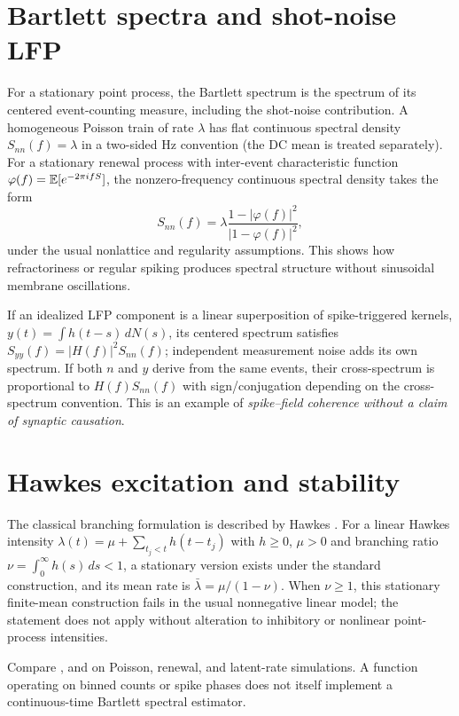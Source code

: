 \section{Bartlett spectra and shot-noise LFP}
For a stationary point process, the Bartlett spectrum is the
spectrum of its centered event-counting measure, including
the shot-noise contribution. A homogeneous Poisson train of
rate $\lambda$ has flat continuous spectral density
$S_{nn}(f)=\lambda$ in a two-sided Hz convention
(the DC mean is treated separately).
For a stationary renewal process with inter-event characteristic
function $\varphi(f)=\mathbb{E}[e^{-2\pi ifS}]$, the nonzero-frequency
continuous spectral density takes the form
\[
S_{nn}(f)=\lambda
\frac{1-|\varphi(f)|^2}{|1-\varphi(f)|^2},
\]
under the usual nonlattice and regularity assumptions.
This shows how refractoriness or regular spiking produces
spectral structure without sinusoidal membrane oscillations.

If an idealized LFP component is a linear superposition of
spike-triggered kernels, $y(t)=\int h(t-s)\,dN(s)$,
its centered spectrum satisfies
$S_{yy}(f)=|H(f)|^2S_{nn}(f)$;
independent measurement noise adds its own spectrum.
If both $n$ and $y$ derive from the same events, their cross-spectrum
is proportional to $H(f)S_{nn}(f)$ with sign/conjugation depending
on the cross-spectrum convention. This is an example of
\emph{spike--field coherence without a claim of synaptic causation}.

\section{Hawkes excitation and stability}\label{sec:hawkes}
The classical branching formulation is described by Hawkes
\cite{hawkes1971}.
For a linear Hawkes intensity
$\lambda(t)=\mu+\sum_{t_j<t}h(t-t_j)$ with
$h\ge0$, $\mu>0$ and branching ratio
$\nu=\int_0^\infty h(s)\,ds<1$,
a stationary version exists under the standard construction,
and its mean rate is $\bar\lambda=\mu/(1-\nu)$.
When $\nu\ge1$, this stationary finite-mean construction
fails in the usual nonnegative linear model; the statement
does not apply without alteration to inhibitory or nonlinear
point-process intensities.

\begin{example}\sloppy
Compare ,
 and
 on Poisson,
renewal, and latent-rate simulations. A function operating on
binned counts or spike phases does not itself implement a
continuous-time Bartlett spectral estimator.
\end{example}
